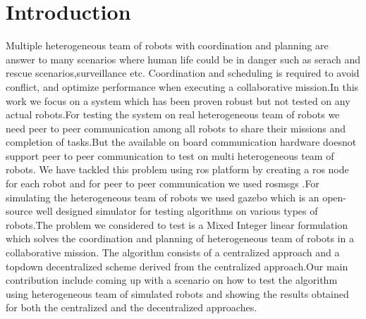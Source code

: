 \documentclass[conference]{IEEEtran}
\begin{document}

%
\IEEEpeerreviewmaketitle



\section{Introduction}
Multiple heterogeneous team of robots with coordination and planning are answer to many scenarios where human life could be in danger such as serach and rescue scenarios,surveillance etc. Coordination and scheduling is required to avoid conflict, and optimize performance when executing a collaborative mission.In this work we focus on a system which has been proven robust but not tested on any actual robots.For testing the system on real heterogeneous team of robots we need peer to peer communication among all robots to share their missions and completion of tasks.But the available on board communication hardware doesnot support peer to peer communication to test on multi heterogeneous team of robots. We have tackled this problem using ros platform by creating a ros node for each robot and for peer to peer communication we used rosmsgs .For simulating the heterogeneous team of robots we used gazebo which is an open-source well designed simulator for testing algorithms on various types of robots.The problem we considered to test is a Mixed Integer linear formulation which solves the coordination and planning of heterogeneous team of robots in a collaborative mission.
The algorithm consists of a centralized approach and a topdown decentralized scheme derived from the centralized approach.Our main contribution include coming up with a scenario on how to test the algorithm using heterogeneous team of simulated robots and showing the results obtained for both the centralized and the decentralized approaches.  
\end{document}
